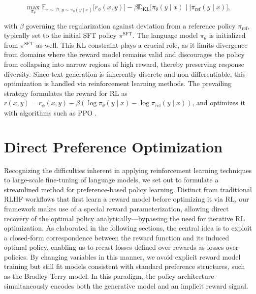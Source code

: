 \begin{equation}\label{eq:RL}
\max_{\pi_{\theta}}  \mathbb{E}_{x\sim \mathcal{D}, y\sim \pi_{\theta}(y \mid x)}\bigl[r_{\phi}(x, y)\bigr] - \beta\mathbb{D}_{\textrm{KL}}\bigl[\pi_{\theta}(y\mid x)\mid \mid \pi_\text{ref}(y\mid x)\bigr],
\end{equation}

with $\beta$ governing the regularization against deviation from a reference policy $\pi_\text{ref}$, typically set to the initial SFT policy $\pi^\text{SFT}$. The language model $\pi_\theta$ is initialized from $\pi^\text{SFT}$ as well. This KL constraint plays a crucial role, as it limits divergence from domains where the reward model remains valid and discourages the policy from collapsing into narrow regions of high reward, thereby preserving response diversity. Since text generation is inherently discrete and non-differentiable, this optimization is handled via reinforcement learning methods. The prevailing strategy \citep{ziegler2020finetuning, stiennon2022learning, bai2022training, ouyang2022training} formulates the reward for RL as ${r(x, y) = r_{\phi}(x, y) -\beta (\log \pi_{\theta}(y\mid x) - \log \pi_\text{ref}(y\mid x))}$, and optimizes it with algorithms such as PPO \cite{schulman2017proximal}.

\section{Direct Preference Optimization}\label{sec:DPO}

Recognizing the difficulties inherent in applying reinforcement learning techniques to large-scale fine-tuning of language models, we set out to formulate a streamlined method for preference-based policy learning. Distinct from traditional RLHF workflows that first learn a reward model before optimizing it via RL, our framework makes use of a special reward parameterization, allowing direct recovery of the optimal policy analytically—bypassing the need for iterative RL optimization. As elaborated in the following sections, the central idea is to exploit a closed-form correspondence between the reward function and its induced optimal policy, enabling us to recast losses defined over rewards as losses over policies. By changing variables in this manner, we avoid explicit reward model training but still fit models consistent with standard preference structures, such as the Bradley-Terry model. In this paradigm, the policy architecture simultaneously encodes both the generative model and an implicit reward signal.

